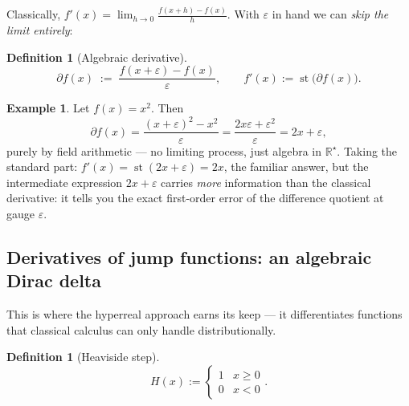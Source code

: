 \documentclass[11pt]{article}
\theoremstyle{definition}
\newtheorem{definition}[theorem]{Definition}
\newtheorem{example}[theorem]{Example}
\theoremstyle{remark}
\newcommand{\Rstar}{\mathbb{R}^{\star}}
\newcommand{\eps}{\varepsilon}
\newcommand{\st}{\operatorname{st}}
\begin{document}
Classically, $f'(x) = \lim_{h\to 0} \frac{f(x+h)-f(x)}{h}$. With $\eps$ in
hand we can \emph{skip the limit entirely}:

\begin{definition}[Algebraic derivative]
\[
\partial f(x) \;:=\; \frac{f(x+\eps) - f(x)}{\eps}, \qquad
f'(x) := \st\big(\partial f(x)\big).
\]
\end{definition}

\begin{example}
Let $f(x)=x^2$. Then
\[
\partial f(x) = \frac{(x+\eps)^2 - x^2}{\eps} = \frac{2x\eps + \eps^2}{\eps} = 2x + \eps,
\]
purely by field arithmetic — no limiting process, just algebra in
$\Rstar$. Taking the standard part: $f'(x) = \st(2x+\eps) = 2x$, the
familiar answer, but the intermediate expression $2x+\eps$ carries
\emph{more} information than the classical derivative: it tells you the
exact first-order error of the difference quotient at gauge $\eps$.
\end{example}

\subsection{Derivatives of jump functions: an algebraic Dirac delta}

This is where the hyperreal approach earns its keep — it differentiates
functions that classical calculus can only handle distributionally.

\begin{definition}[Heaviside step]
\[
H(x) := \begin{cases} 1 & x \ge 0 \\ 0 & x < 0\end{cases}.
\]
\end{definition}
\end{document}
